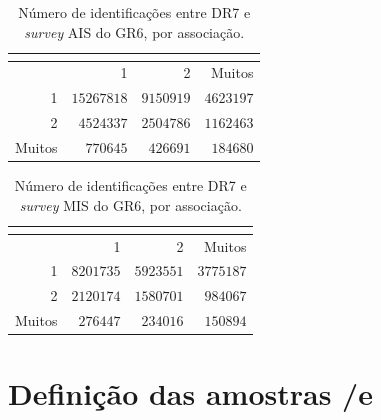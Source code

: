 \begin{table}
	\caption[Número de identificações entre \SDSS DR7 e {\em survey} AIS do \galex
	GR6, por associação.]
	{Número de identificações entre \SDSS DR7 e {\em survey} AIS do \galex GR6, por
	associação.}
	\setlength{\tabcolsep}{1cm}
	\begin{tabular}{r r r r}
	\galex &          \multicolumn{3}{c}{\SDSS} \\
	\midrule
	       &          1 &         2 &    Muitos \\
	1      & $15267818$ & $9150919$ & $4623197$ \\
	2      &  $4524337$ & $2504786$ & $1162463$ \\
	Muitos &   $770645$ &  $426691$ &  $184680$ \\
	\end{tabular}
	\label{tab:SDSSxGalexMatchesAIS}
\end{table}

\begin{table}
	\caption[Número de identificações entre \SDSS DR7 e {\em survey} AIS do \galex
	GR6, por associação.]
	{Número de identificações entre \SDSS DR7 e {\em survey} MIS do \galex GR6, por
	associação.}
	\setlength{\tabcolsep}{1cm}
	\begin{tabular}{r r r r}
	\galex &         \multicolumn{3}{c}{\SDSS} \\
	\midrule
	       &         1 &        2 &     Muitos \\
	1      & $8201735$ & $5923551$ & $3775187$ \\
	2      & $2120174$ & $1580701$ &  $984067$ \\
	Muitos &  $276447$ &  $234016$ &  $150894$ \\
	\end{tabular}
	\label{tab:SDSSxGalexMatchesMIS}
\end{table}



\section{Definição das amostras \SDSS/\starlight e \galex}
\label{sec:Crossmatch:DefAmostras}

